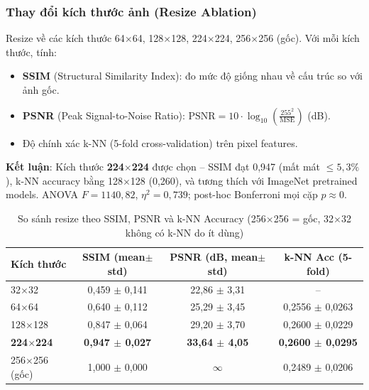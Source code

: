 \documentclass[12pt,a4paper]{article}
\let\oldtextbf\textbf
\renewcommand{\textbf}[1]{\oldtextbf{\textcolor{hcmublue}{#1}}}
\begin{document}
\subsubsection{Thay đổi kích thước ảnh (Resize Ablation)}

Resize về các kích thước 64$\times$64, 128$\times$128, 224$\times$224, 256$\times$256 (gốc). Với mỗi kích thước, tính:
\begin{itemize}
    \item \textbf{SSIM} (Structural Similarity Index): đo mức độ giống nhau về cấu trúc so với ảnh gốc.
    \item \textbf{PSNR} (Peak Signal-to-Noise Ratio): $\text{PSNR} = 10\cdot\log_{10}\!\!\left(\frac{255^2}{\text{MSE}}\right)$ (dB).
    \item Độ chính xác k-NN (5-fold cross-validation) trên pixel features.
\end{itemize}

\textbf{Kết luận}: Kích thước \textbf{224$\times$224} được chọn -- SSIM đạt 0{,}947 (mất mát $\leq 5{,}3\%$), k-NN accuracy bằng 128$\times$128 (0{,}260), và tương thích với ImageNet pretrained models. ANOVA $F=1140{,}82$, $\eta^2=0{,}739$; post-hoc Bonferroni mọi cặp $p \approx 0$.

\begin{table}[H]
\centering
\begin{tabular}{|l|c|c|c|}
\hline
\textbf{Kích thước} & \textbf{SSIM (mean$\pm$std)} & \textbf{PSNR (dB, mean$\pm$std)} & \textbf{k-NN Acc (5-fold)} \\ \hline
32$\times$32         & 0{,}459 $\pm$ 0{,}141 & 22{,}86 $\pm$ 3{,}31 & -- \\ \hline
64$\times$64         & 0{,}640 $\pm$ 0{,}112 & 25{,}29 $\pm$ 3{,}45 & 0{,}2556 $\pm$ 0{,}0263 \\ \hline
128$\times$128       & 0{,}847 $\pm$ 0{,}064 & 29{,}20 $\pm$ 3{,}70 & 0{,}2600 $\pm$ 0{,}0229 \\ \hline
\textbf{224$\times$224} & \textbf{0{,}947 $\pm$ 0{,}027} & \textbf{33{,}64 $\pm$ 4{,}05} & \textbf{0{,}2600 $\pm$ 0{,}0295} \\ \hline
256$\times$256 (gốc) & 1{,}000 $\pm$ 0{,}000 & $\infty$ & 0{,}2489 $\pm$ 0{,}0206 \\ \hline
\end{tabular}
\caption{So sánh resize theo SSIM, PSNR và k-NN Accuracy (256$\times$256 = gốc, 32$\times$32 không có k-NN do ít dùng)}
\label{tab:resize_ablation}
\end{table}
\end{document}
